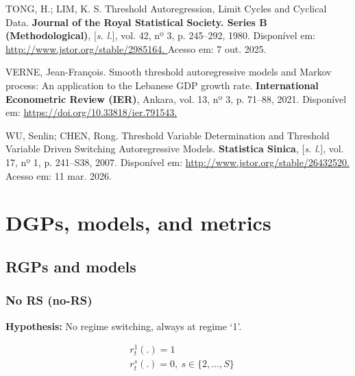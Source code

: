 \documentclass[
  letterpaper,
  DIV=11,
  numbers=noendperiod]{scrartcl}
\newlength{\cslhangindent}
\newenvironment{CSLReferences}[2] %
 {\begin{list}{}{%
  \setlength{\itemindent}{0pt}
  \setlength{\leftmargin}{0pt}
  \setlength{\parsep}{0pt}
  \ifodd #1
   \setlength{\leftmargin}{\cslhangindent}
   \setlength{\itemindent}{-1\cslhangindent}
  \fi
  \setlength{\itemsep}{#2\baselineskip}}}
 {\end{list}}
\numberwithin{equation}{section}
\numberwithin{table}{section}
\numberwithin{figure}{section}
\let\oldsection\section
\renewcommand\section{\clearpage\oldsection}
\begin{document}
\begin{CSLReferences}{0}{1}
TONG, H.; LIM, K. S. Threshold Autoregression, Limit Cycles and Cyclical
Data. \textbf{Journal of the Royal Statistical Society. Series B
(Methodological)}, {[}\emph{s. l.}{]}, vol. 42, nº 3, p. 245--292, 1980.
Disponível em:
\href{http://www.jstor.org/stable/2985164}{http://www.jstor.org/stable/2985164.
}Acesso em: 7 out. 2025.

VERNE, Jean-François. Smooth threshold autoregressive models and Markov
process: An application to the Lebanese GDP growth rate.
\textbf{International Econometric Review (IER)}, Ankara, vol. 13, nº 3,
p. 71--88, 2021. Disponível em:
\href{https://doi.org/10.33818/ier.791543}{https://doi.org/10.33818/ier.791543.
}

WU, Senlin; CHEN, Rong. Threshold Variable Determination and Threshold
Variable Driven Switching Autoregressive Models. \textbf{Statistica
Sinica}, {[}\emph{s. l.}{]}, vol. 17, nº 1, p. 241--S38, 2007.
Disponível em:
\href{http://www.jstor.org/stable/26432520}{http://www.jstor.org/stable/26432520.
}Acesso em: 11 mar. 2026.

\end{CSLReferences}

\newpage{}

\appendix
{}
\renewcommand{\thesubsection}{\Alph{section}.\arabic{subsection}}

\section{DGPs, models, and metrics}\label{sec-app-cons}

\subsection{RGPs and models}\label{rgps-and-models}

\subsubsection{No RS (no-RS)}\label{no-rs-no-rs}

\textbf{Hypothesis:} No regime switching, always at regime `1'.

\begin{equation}
\begin{array}{ll}
    &r^1_t(.) = 1\\
    &r^s_t(.) = 0, ~ s \in \{2, \dots, S\}
\end{array}
\end{equation}
\end{document}
